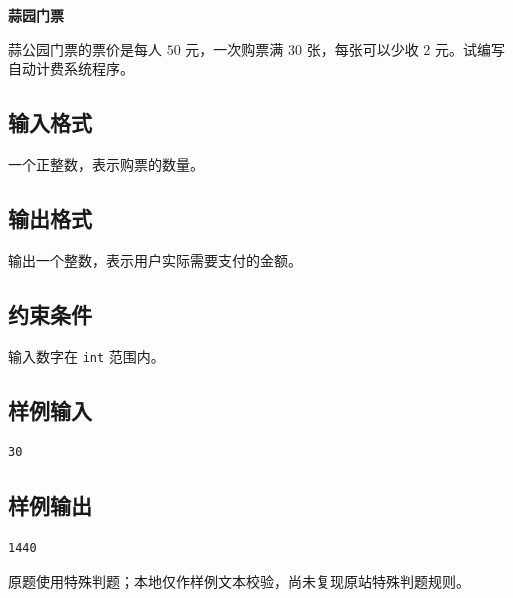 \documentclass{article}
\newcommand{\problemname}[1]{\begin{center}\Large\bfseries #1\end{center}}
\begin{document}
\problemname{蒜园门票}

蒜公园门票的票价是每人 $50$ 元，一次购票满 $30$ 张，每张可以少收 $2$ 元。试编写自动计费系统程序。

\subsection*{输入格式}
一个正整数，表示购票的数量。

\subsection*{输出格式}
输出一个整数，表示用户实际需要支付的金额。

\subsection*{约束条件}
输入数字在 \texttt{int} 范围内。

\subsection*{样例输入}
\begin{verbatim}
30
\end{verbatim}

\subsection*{样例输出}
\begin{verbatim}
1440
\end{verbatim}

原题使用特殊判题；本地仅作样例文本校验，尚未复现原站特殊判题规则。
\end{document}
